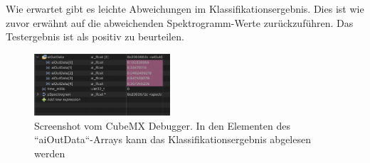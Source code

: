 \begin{adjustwidth}{0.5cm}{0cm}
Wie erwartet gibt es leichte Abweichungen im Klassifikationsergebnis. Dies ist wie zuvor erwähnt auf die abweichenden Spektrogramm-Werte zurückzuführen. Das Testergebnis ist als positiv zu beurteilen. 

\begin{figure}[h!]
\centering
\includegraphics[width=0.45\textwidth]{images/10_test_validierung/nn/nn-debuger-classification-result.png}
\caption{Screenshot vom CubeMX Debugger. In den Elementen des ``aiOutData``-Arrays kann das Klassifikationsergebnis abgelesen werden}

\label{fig:img-stm-classification-result}
\end{figure}

\end{adjustwidth}

